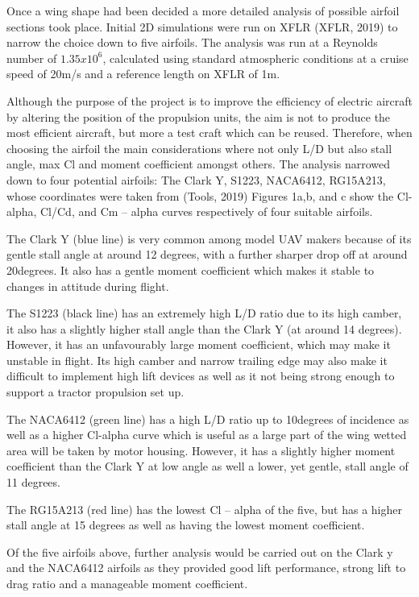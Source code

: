 \documentclass[../../main.tex]{subfiles}
\begin{document}
Once a wing shape had been decided a more detailed analysis of possible airfoil sections took place.
Initial 2D simulations were run on XFLR (XFLR, 2019) to narrow the choice down to five airfoils.
The analysis was run at a Reynolds number of $1.35x10^6$, calculated using standard atmospheric conditions at a cruise speed of 20m/s and a reference length on XFLR of 1m. 

Although the purpose of the project is to improve the efficiency of electric aircraft by altering the position of the propulsion units, the aim is not to produce the most efficient aircraft, but more a test craft which can be reused.
Therefore, when choosing the airfoil the main considerations where not only L/D but also stall angle, max Cl and moment coefficient amongst others.
The analysis narrowed down to four potential airfoils: The Clark Y, S1223, NACA6412, RG15A213, whose coordinates were taken from (Tools, 2019) Figures 1a,b, and c  show the Cl-alpha, Cl/Cd, and Cm – alpha curves respectively of four suitable airfoils. 

The Clark Y (blue line) is very common among model UAV makers because of its gentle stall angle at around 12 degrees, with a further sharper drop off at around 20degrees.
It also has a gentle moment coefficient which makes it stable to changes in attitude during flight. 

The S1223 (black line) has an extremely high L/D ratio due to its high camber, it also has a slightly higher stall angle than the Clark Y (at around 14 degrees).
However, it has an unfavourably large moment coefficient, which may make it unstable in flight.
Its high camber and narrow trailing edge may also make it difficult to implement high lift devices as well as it not being strong enough to support a tractor propulsion set up. 

The NACA6412  (green line) has a high L/D ratio up to 10degrees of incidence as well as a higher Cl-alpha curve which is useful as a large part of the wing wetted area will be taken by motor housing.
However, it has a slightly higher moment coefficient than the Clark Y at low angle as well a lower, yet gentle, stall angle of 11 degrees.

The RG15A213 (red line) has the lowest Cl – alpha of the five, but has a higher stall angle at 15 degrees as well as having the lowest moment coefficient.

Of the five airfoils above, further analysis would be carried out on the Clark y and the NACA6412 airfoils as they provided good lift performance, strong lift to drag ratio and a manageable moment coefficient.
\end{document}
